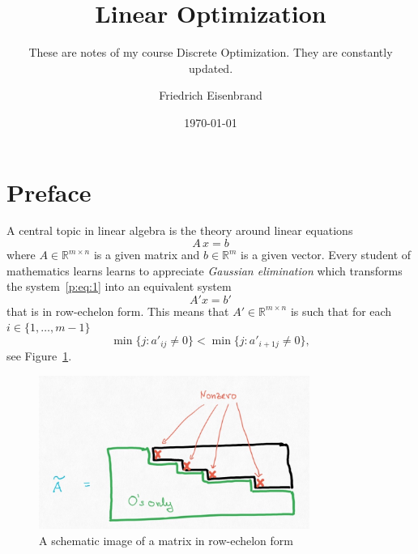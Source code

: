 \documentclass[11pt,envcountchap,pdf]{svmono}
\date{\today}
\author{Friedrich Eisenbrand}
\title{Linear Optimization}
\subtitle{These are notes of my course Discrete Optimization. They are constantly updated. }
\begin{document}
\maketitle


\tableofcontents 

\smartqed





\chapter*{Preface} 

A central topic in linear algebra is the theory around  linear equations 
\begin{equation} 
\label{p:eq:1}
  A \, x = b
\end{equation}
where $A ∈ ℝ^{m×n}$ is a given matrix and $b ∈ ℝ^m$ is a given vector. Every student of mathematics learns learns to appreciate \emph{Gaussian elimination} which transforms the system~\eqref{p:eq:1}  into an equivalent system  
\begin{displaymath}
  {A}' x = {b}'
\end{displaymath}
that is in row-echelon form. This means that ${A}' ∈ ℝ^{m×n}$ is such that 
  for each $i ∈ \{ 1,\dots , m-1\}$
  \begin{displaymath}
    \min\{ j : {a}'_{ij} \neq 0\} <  \min\{ j : {a}'_{i+1j} \neq 0\},
  \end{displaymath}
see Figure~\ref{fig:8}. 


\begin{figure}
  \centering
 \includegraphics[height=5cm]{figures/RowEchelon.jpg}
  \caption{A schematic image of a matrix in row-echelon form} 
\label{fig:8}
\end{figure}
\end{document}
